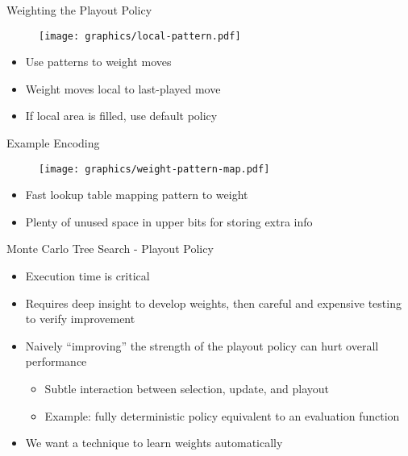 \documentclass{beamer}
\begin{document}
\begin{frame}{Weighting the Playout Policy}
\begin{figure}
  \begin{center}
  \texttt{[image: graphics/local-pattern.pdf]}
  \label{fig:encoding}
  \end{center}
\end{figure}
\begin{itemize}
	\item Use patterns to weight moves
	\item Weight moves local to last-played move
	\item If local area is filled, use default policy
\end{itemize}
\end{frame}

\begin{frame}{Example Encoding}
\begin{figure}
  \begin{center}
  \texttt{[image: graphics/weight-pattern-map.pdf]}
  \label{fig:encoding}
  \end{center}
\end{figure}
\begin{itemize}
	\item Fast lookup table mapping pattern to weight
	\item Plenty of unused space in upper bits for storing extra info
\end{itemize}
\end{frame}

\begin{frame}{Monte Carlo Tree Search - Playout Policy}
\begin{itemize}
	\item Execution time is critical
	\item Requires deep insight to develop weights, then careful and expensive testing to verify improvement
	\item Naively ``improving'' the strength of the playout policy can hurt overall performance
	\begin{itemize}
		\item Subtle interaction between selection, update, and playout
		\item Example: fully deterministic policy equivalent to an evaluation function
	\end{itemize}
	\item We want a technique to learn weights automatically
\end{itemize}
\end{frame}
\end{document}
